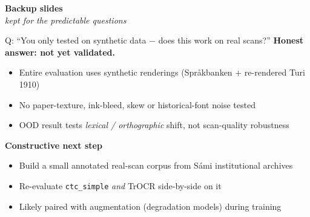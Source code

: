
\appendix

\begin{frame}
  \centering
  \vfill
  {\Huge\textbf{Backup slides}}\\[0.4em]
  \large{\emph{kept for the predictable questions}}
  \vfill
\end{frame}

\begin{frame}{Q: ``You only tested on synthetic data $-$ does this work on real scans?''}
  \footnotesize
  \textbf{Honest answer: not yet validated.}
  \medskip
  \begin{itemize}
    \item Entire evaluation uses synthetic renderings (Spr\r{a}kbanken + re-rendered Turi 1910)
    \item No paper-texture, ink-bleed, skew or historical-font noise tested
    \item OOD result tests \emph{lexical / orthographic} shift, not scan-quality robustness
  \end{itemize}
  \medskip
  \textbf{Constructive next step}
  \begin{itemize}
    \item Build a small annotated real-scan corpus from S\'{a}mi institutional archives
    \item Re-evaluate \texttt{ctc\_simple} \emph{and} TrOCR side-by-side on it
    \item Likely paired with augmentation (degradation models) during training
  \end{itemize}
\end{frame}

